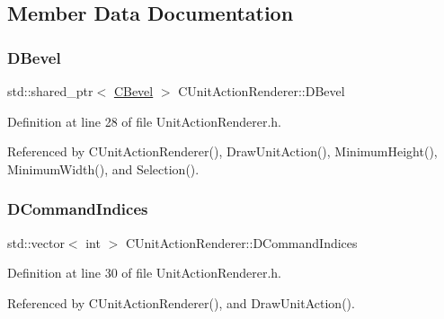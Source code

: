 \subsection{Member Data Documentation}
\hypertarget{classCUnitActionRenderer_a3f4012557f7f4d71cfa02df725984ebb}{}\label{classCUnitActionRenderer_a3f4012557f7f4d71cfa02df725984ebb} 
\subsubsection{\texorpdfstring{D\+Bevel}{DBevel}}
{\footnotesize\ttfamily std\+::shared\+\_\+ptr$<$ \hyperlink{classCBevel}{C\+Bevel} $>$ C\+Unit\+Action\+Renderer\+::\+D\+Bevel\hspace{0.3cm}{\ttfamily [protected]}}



Definition at line 28 of file Unit\+Action\+Renderer.\+h.



Referenced by C\+Unit\+Action\+Renderer(), Draw\+Unit\+Action(), Minimum\+Height(), Minimum\+Width(), and Selection().

\hypertarget{classCUnitActionRenderer_a73eebe87330693c8546ea14c23672859}{}\label{classCUnitActionRenderer_a73eebe87330693c8546ea14c23672859} 
\subsubsection{\texorpdfstring{D\+Command\+Indices}{DCommandIndices}}
{\footnotesize\ttfamily std\+::vector$<$ int $>$ C\+Unit\+Action\+Renderer\+::\+D\+Command\+Indices\hspace{0.3cm}{\ttfamily [protected]}}



Definition at line 30 of file Unit\+Action\+Renderer.\+h.



Referenced by C\+Unit\+Action\+Renderer(), and Draw\+Unit\+Action().

\hypertarget{classCUnitActionRenderer_abf505a324f367378f8c30ddd48bb6549}{}\label{classCUnitActionRenderer_abf505a324f367378f8c30ddd48bb6549} 
